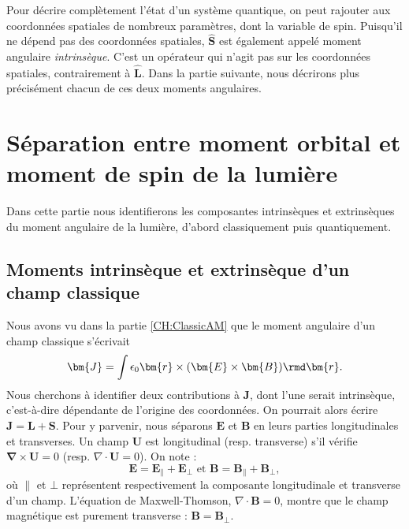 Pour décrire complètement l'état d'un système quantique, on peut rajouter aux coordonnées spatiales de nombreux paramètres, dont la variable de spin. Puisqu'il ne dépend pas des coordonnées spatiales, $\bm{\hat{S}}$ est également appelé moment angulaire \textit{intrinsèque}. C'est un opérateur qui n'agit pas sur les coordonnées spatiales, contrairement à $\bm{\hat{L}}$. 
Dans la partie suivante, nous décrirons plus précisément chacun de ces deux moments angulaires.

\chapter{Séparation entre moment orbital et moment de spin de la lumière}
Dans cette partie nous identifierons les composantes intrinsèques et extrinsèques du moment angulaire de la lumière, d'abord classiquement puis quantiquement.

\section{Moments intrinsèque et extrinsèque d'un champ classique}
Nous avons vu dans la partie \ref{CH:ClassicAM} que le moment angulaire d'un champ classique s'écrivait 
\begin{equation}
\bm{J}=\int{\epsilon_0\bm{r}\times(\bm{E}\times\bm{B})\rmd\bm{r}}.
\label{Eq.JClassEM}
\end{equation} 
Nous cherchons à identifier deux contributions à $\bm{J}$, dont l'une serait intrinsèque, c'est-à-dire dépendante de l'origine des coordonnées. On pourrait alors écrire $\bm{J}=\bm{L}+\bm{S}$. Pour y parvenir, nous séparons $\bm{E}$ et $\bm{B}$ en leurs parties longitudinales et transverses. Un champ $\bm{U}$ est longitudinal (resp. transverse) s'il vérifie $\bm{\nabla}\times\bm{U}=0$ (resp. $\nabla\cdot\bm{U}=0$). On note :
\begin{equation*}
\bm{E}=\bm{E}_{\parallel}+\bm{E}_{\bot} \text{ et } \bm{B}=\bm{B}_{\parallel}+\bm{B}_{\bot},
\end{equation*}
où $\parallel$ et $\bot$ représentent respectivement la composante longitudinale et transverse d'un champ.
L'équation de Maxwell-Thomson, $\nabla\cdot\bm{B}=0$, montre que le champ magnétique est purement transverse : $\bm{B}=\bm{B}_{\bot}$. \par

